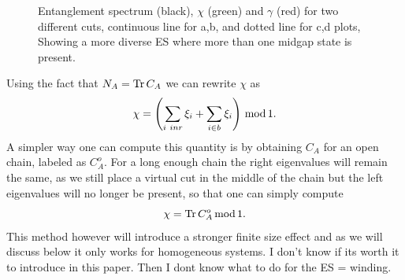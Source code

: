 \documentclass[twocolumn,amsmath,longbibliography,amssymb,superscriptaddress]{revtex4-1}
\newcommand{\carlos}[1]{{\color{red} #1}}
\begin{document}
\begin{figure}[h!]
\centering
{}\hspace{0mm}

\caption{Entanglement spectrum (black), $\chi$ (green) and $\gamma$ (red) for two different cuts,  continuous line for a,b, and dotted line for c,d plots, Showing a more diverse ES where more than one midgap state is present. }
\label{2}
\end{figure}

Using the fact that $N_A = \Tr C_A$ we can rewrite $\chi$ as
\begin{equation}
\chi = \left(\sum_{i\ in r} \xi_i+ \sum_{i\in b}\xi_i\right) \, {\rm mod} \, 1.
\end{equation}
A simpler way one can compute this quantity is by obtaining $C_A$ for an open chain, labeled as $C_A^{ o}$. For a long enough chain the right eigenvalues will remain the same, as we still place a virtual cut in the middle of the chain but the left eigenvalues will no longer be present, so that one can simply compute
\begin{equation}
\chi = \Tr C_A^{o} \, {\rm mod} \, 1.
\end{equation}
This method however will introduce a stronger finite size effect and as we will discuss below it only works for homogeneous systems. \carlos{I don't know if its worth it to introduce in this paper. Then I dont know what to do for the ES = winding. }
\end{document}
